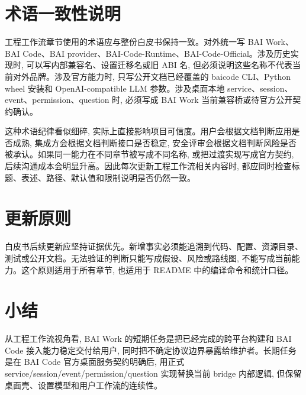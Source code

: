 \section{术语一致性说明}
工程工作流章节使用的术语应与整份白皮书保持一致。对外统一写 BAI Work、BAI Code、BAI provider、BAI-Code-Runtime、BAI-Code-Official。涉及历史实现时, 可以写内部兼容名、设置迁移名或旧 ABI 名, 但必须说明这些名称不代表当前对外品牌。涉及官方能力时, 只写公开文档已经覆盖的 baicode CLI、Python wheel 安装和 OpenAI-compatible LLM 参数。涉及桌面本地 service、session、event、permission、question 时, 必须写成 BAI Work 当前兼容桥或待官方公开契约确认。

这种术语纪律看似细碎, 实际上直接影响项目可信度。用户会根据文档判断应用是否成熟, 集成方会根据文档判断接口是否稳定, 安全评审会根据文档判断风险是否被承认。如果同一能力在不同章节被写成不同名称, 或把过渡实现写成官方契约, 后续沟通成本会明显升高。因此每次更新工程工作流相关内容时, 都应同时检查标题、表述、路径、默认值和限制说明是否仍然一致。

\section{更新原则}
白皮书后续更新应坚持证据优先。新增事实必须能追溯到代码、配置、资源目录、测试或公开文档。无法验证的判断只能写成假设、风险或路线图, 不能写成当前能力。这个原则适用于所有章节, 也适用于 README 中的编译命令和统计口径。

\section{小结}
从工程工作流视角看, BAI Work 的短期任务是把已经完成的跨平台构建和 BAI Code 接入能力稳定交付给用户, 同时把不确定协议边界暴露给维护者。长期任务是在 BAI Code 官方桌面服务契约明确后, 用正式 service/session/event/permission/question 实现替换当前 bridge 内部逻辑, 但保留桌面壳、设置模型和用户工作流的连续性。
